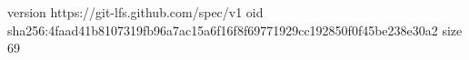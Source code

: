 version https://git-lfs.github.com/spec/v1
oid sha256:4faad41b8107319fb96a7ac15a6f16f8f69771929cc192850f0f45be238e30a2
size 69

